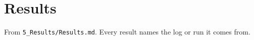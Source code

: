 \section{Results}
\label{sec:results}

From \texttt{5\_Results/Results.md}. Every result names the log or run it comes
from.
